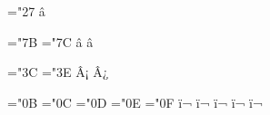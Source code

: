 
\chardef\erq="27
\mubyte \erq ^^e2^^80^^99\endmubyte %


\chardef\endash="7B
\chardef\emdash="7C
\mubyte \endash ^^e2^^80^^93\endmubyte %
\mubyte \emdash ^^e2^^80^^94\endmubyte %

\chardef\utfinvexclamation="3C
\chardef\utfinvquestion="3E
\mubyte \utfinvexclamation ^^c2^^a1\endmubyte %
\mubyte \utfinvquestion ^^c2^^bf\endmubyte %

\chardef\utfligatureff="0B
\chardef\utfligaturefi="0C
\chardef\utfligaturefl="0D
\chardef\utfligatureffi="0E
\chardef\utfligatureffl="0F
\mubyte \utfligatureff ^^ef^^ac^^80\endmubyte %
\mubyte \utfligaturefi ^^ef^^ac^^81\endmubyte %
\mubyte \utfligaturefl ^^ef^^ac^^82\endmubyte %
\mubyte \utfligatureffi ^^ef^^ac^^83\endmubyte %
\mubyte \utfligatureffl ^^ef^^ac^^84\endmubyte %



 

\endinput
